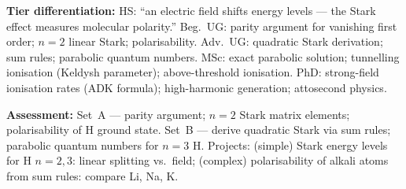 \documentclass[11pt,a4paper]{article}
\begin{document}
\begin{tcolorbox}[modulebox, title={Module~I.4 / L07: Stark Effect}]
\medskip\textbf{Tier differentiation:}
HS: ``an electric field shifts energy levels --- the Stark effect measures molecular polarity.''
Beg.\ UG: parity argument for vanishing first order; $n=2$ linear Stark; polarisability.
Adv.\ UG: quadratic Stark derivation; sum rules; parabolic quantum numbers.
MSc: exact parabolic solution; tunnelling ionisation (Keldysh parameter); above-threshold ionisation.
PhD: strong-field ionisation rates (ADK formula); high-harmonic generation; attosecond physics.

\medskip\textbf{Assessment:}
Set~A --- parity argument; $n=2$ Stark matrix elements; polarisability of H ground state.
Set~B --- derive quadratic Stark via sum rules; parabolic quantum numbers for $n=3$ H.
Projects: (simple) Stark energy levels for H $n=2,3$: linear splitting vs.\ field;
(complex) polarisability of alkali atoms from sum rules: compare Li, Na, K.
\end{tcolorbox}

\medskip
\end{document}
